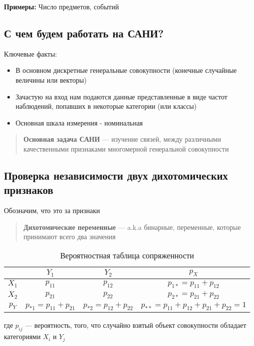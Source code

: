 \documentclass{article}
\begin{document}
    \textbf{Примеры: } Число предметов, событий

    \subsection{С чем будем работать на САНИ?}

    Ключевые факты:

    \begin{itemize}
        \item В основном дискретные генеральные совокупности (конечные случайные величины или векторы)
        \item Зачастую на вход нам подаются данные представленные в виде частот наблюдений, попавших в некоторые категории (или классы)
        \item Основная шкала измерения - номинальная
    \end{itemize}

    \begin{quote}
        \textbf{Основная задача САНИ} --- изучение связей, между различными качественными признаками многомерной генеральной совокупности
    \end{quote}

    \subsection{Проверка независимости двух дихотомических признаков}

    Обозначим, что это за признаки

    \begin{quote}
        \textbf{Дихотомические переменные} --- a.k.a бинарные, переменные, которые принимают всего два значения
    \end{quote}


    \begin{table}[h!]
    \centering
    \begin{tabular}{|c|c|c|c|}
      \hline
      & $Y_{1}$ & $Y_{2}$ & $p_{X}$ \\ \hline
      $X_{1}$ & $p_{11}$ & $p_{12}$ & $p_{1*} = p_{11} + p_{12}$  \\ \hline
      $X_{2}$ & $p_{21}$ & $p_{22}$ & $p_{2*} = p_{21} + p_{22}$ \\ \hline
      \textbf{$p_{Y}$} & $p_{*1} = p_{11} + p_{21}$ & $p_{*2} = p_{12} + p_{22}$ & $p_{**} = p_{11} + p_{12} + p_{21} + p_{22} = 1$ \\ \hline
    \end{tabular}
    \caption{Вероятностная таблица сопряженности}
    \label{tab:prob}
    \end{table}
    где $p_{ij}$ --- вероятность, того, что случайно взятый объект совокупности обладает категориями $X_{i}$ и $Y_{j}$
\end{document}
